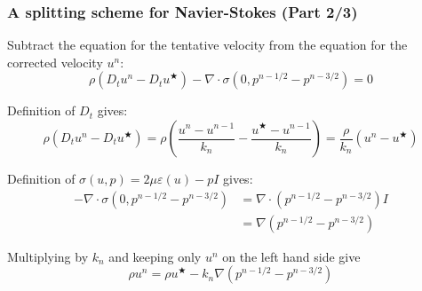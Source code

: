 \begin{frame}
  \frametitle{A splitting scheme for Navier-Stokes (Part 2/3)}

  \vspace{1em}
  Subtract the equation for the tentative velocity from the equation
  for the \alert{corrected velocity} $u^n$:
  \begin{equation*}
    \rho (D_t u^n - D_t u^{\bigstar})
    - \nabla \cdot \sigma(0, p^{n-1/2} - p^{n-3/2})
    = 0
  \end{equation*}

  Definition of $D_t$ gives:
  \begin{equation*}
    \rho (D_t u^n - D_t u^{\bigstar})
    = \rho \left ( \frac{u^n - u^{n-1}}{k_n} - \frac{u^{\bigstar} - u^{n-1}}{k_n} \right )
    = \frac{\rho}{k_n}(u^n - u^{\bigstar})
    \end{equation*}

  Definition of $\sigma(u, p) = 2 \mu \varepsilon (u) - p I $ gives:
  \begin{equation*}
  \begin{split}
    - \nabla \cdot \sigma(0, p^{n-1/2} - p^{n-3/2})
    &=  \nabla \cdot (p^{n-1/2} - p^{n-3/2}) I \\
    &=  \nabla (p^{n-1/2} - p^{n-3/2})
  \end{split}
  \end{equation*}

  Multiplying by $k_n$ and keeping only $u^n$ on the left hand side give
  \begin{equation}
    \rho u^n = \rho u^{\bigstar} - k_n \nabla (p^{n-1/2} - p^{n-3/2})
    \label{eq:velocitycorrection}
  \end{equation}

  \end{frame}



